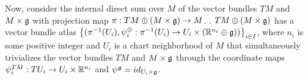 Now, consider the internal direct sum over $M$ of the vector bundles $TM$ and $M \times \mathfrak{g}$ with projection map $\pi: TM \oplus (M \times \mathfrak{g}) \to M$. %
. $TM \oplus (M \times \mathfrak{g})$ has a vector bundle atlas $\left\{ (\pi^{-1}(U_i), \psi^\oplus_i: \pi^{-1}(U_i) \to U_i \times (\mathbb{R}^{n_i} \oplus \mathfrak{g})) \right\}_{i \in I}$, where $n_i$ is some positive integer and $U_i$ is a chart neighborhood of $M$ that simultaneously trivializes the vector bundles $TM$ and $M \times \mathfrak{g}$ through the coordinate maps $\psi^{TM}_i: TU_i \to U_i \times \mathbb{R}^{n_i}$  and $\psi^{\mathfrak{g}} = id_{U_i \times \mathfrak{g}}$.

